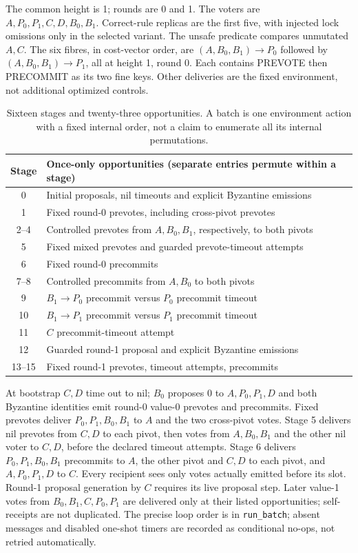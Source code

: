 The common height is 1; rounds are 0 and 1. The voters are
\(A,P_0,P_1,C,D,B_0,B_1\). Correct-rule replicas are the first five,
with injected lock omissions only in the selected variant. The unsafe
predicate compares unmutated \(A,C\). The six fibres, in cost-vector
order, are \((A,B_0,B_1)\to P_0\) followed by \((A,B_0,B_1)\to P_1\),
all at height 1, round 0. Each contains PREVOTE then PRECOMMIT as its
two fine keys. Other deliveries are the fixed environment, not
additional optimized controls.

\begin{table}[ht]
\centering\small
\begin{tabular}{cl}
\toprule
Stage & Once-only opportunities (separate entries permute within a stage) \\
\midrule
0 & Initial proposals, nil timeouts and explicit Byzantine emissions \\
1 & Fixed round-0 prevotes, including cross-pivot prevotes \\
2--4 & Controlled prevotes from $A,B_0,B_1$, respectively, to both pivots \\
5 & Fixed mixed prevotes and guarded prevote-timeout attempts \\
6 & Fixed round-0 precommits \\
7--8 & Controlled precommits from $A,B_0$ to both pivots \\
9 & $B_1\to P_0$ precommit versus $P_0$ precommit timeout \\
10 & $B_1\to P_1$ precommit versus $P_1$ precommit timeout \\
11 & $C$ precommit-timeout attempt \\
12 & Guarded round-1 proposal and explicit Byzantine emissions \\
13--15 & Fixed round-1 prevotes, timeout attempts, precommits \\
\bottomrule
\end{tabular}
\caption{Sixteen stages and twenty-three opportunities. A batch is one environment action with a fixed internal order, not a claim to enumerate all its internal permutations.}
\label{tab:scaled-stages}
\end{table}

At bootstrap \(C,D\) time out to nil; \(B_0\) proposes 0 to
\(A,P_0,P_1,D\) and both Byzantine identities emit round-0 value-0
prevotes and precommits. Fixed prevotes deliver \(P_0,P_1,B_0,B_1\) to
\(A\) and the two cross-pivot votes. Stage 5 delivers nil prevotes from
\(C,D\) to each pivot, then votes from \(A,B_0,B_1\) and the other nil
voter to \(C,D\), before the declared timeout attempts. Stage 6 delivers
\(P_0,P_1,B_0,B_1\) precommits to \(A\), the other pivot and \(C,D\) to
each pivot, and \(A,P_0,P_1,D\) to \(C\). Every recipient sees only
votes actually emitted before its slot. Round-1 proposal generation by
\(C\) requires its live proposal step. Later value-1 votes from
\(B_0,B_1,C,P_0,P_1\) are delivered only at their listed opportunities;
self-receipts are not duplicated. The precise loop order is in
\texttt{run\_batch}; absent messages and disabled one-shot timers are
recorded as conditional no-ops, not retried automatically.

